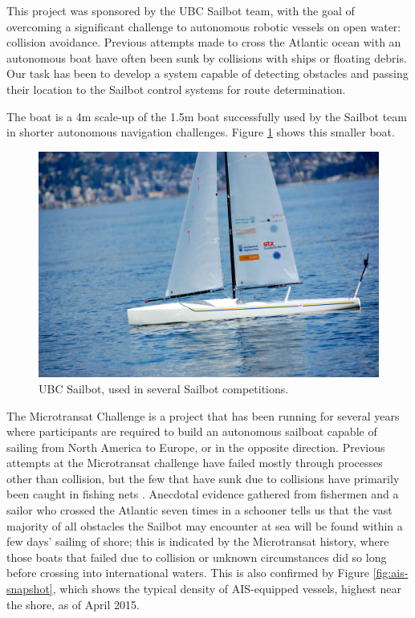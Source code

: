 This project was sponsored by the UBC Sailbot team, with the goal of overcoming a significant challenge to autonomous robotic vessels on open water: collision avoidance. Previous attempts made to cross the Atlantic ocean with an autonomous boat have often been sunk by collisions with ships or floating debris. Our task has been to develop a system capable of detecting obstacles and passing their location to the Sailbot control systems for route determination.

The boat is a 4m scale-up of the 1.5m boat successfully used by the Sailbot team in shorter autonomous navigation challenges. Figure \ref{fig:sailbot} shows this smaller boat.

\begin{figure}
\includegraphics[width=120mm,natwidth=1203,natheight=627]{"./image/sailbot"}
\caption[UBC Sailbot.]{\label{fig:sailbot}UBC Sailbot, used in several Sailbot competitions. \cite{ubc-sailbot__image}}
\end{figure}

The Microtransat Challenge \cite{transat-history} is a project that has been running for several years where participants are required to build an autonomous sailboat capable of sailing from North America to Europe, or in the opposite direction. Previous attempts at the Microtransat challenge have failed mostly through processes other than collision, but the few that have sunk due to collisions have primarily been caught in fishing nets \cite{transat-history}. Anecdotal evidence gathered from fishermen and a sailor who crossed the Atlantic seven times in a schooner tells us that the vast majority of all obstacles the Sailbot may encounter at sea will be found within a few days' sailing of shore; this is indicated by the Microtransat history, where those boats that failed due to collision or unknown circumstances did so long before crossing into international waters. This is also confirmed by Figure \ref{fig:ais-snapshot}, which shows the typical density of AIS-equipped vessels, highest near the shore, as of April 2015\cite{marine-traffic}.

